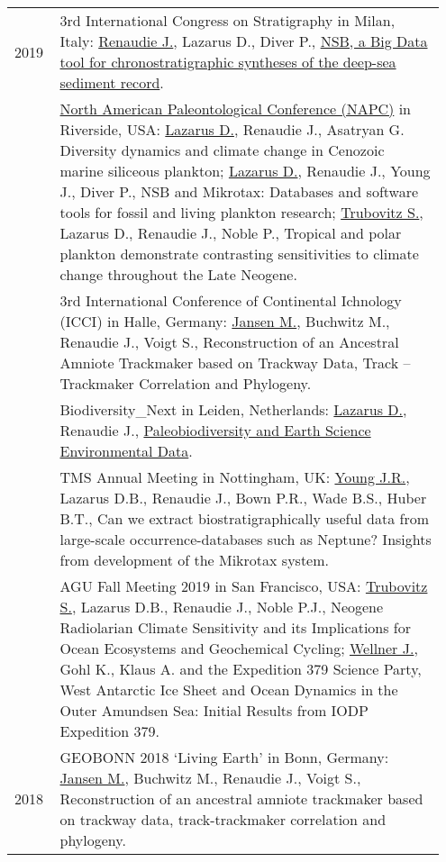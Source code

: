 \documentclass[11pt, a4paper]{article}
\makeatletter
\newcommand\footnoteref[1]{\protected@xdef\@thefnmark{\ref{#1}}\@footnotemark}
\makeatother
\begin{document}
\begin{longtable}{p{0.1\linewidth} P{0.85\linewidth}}
2019 & 3rd International Congress on Stratigraphy in Milan, Italy: \underline{Renaudie J.}, Lazarus D., Diver P., \href{http://plannapus.github.io/data/20190723Potsdam.pdf}{NSB, a Big Data tool for chronostratigraphic syntheses of the deep-sea sediment record}.\\
& \href{https://escholarship.org/uc/item/6r18f8wn}{North American Paleontological Conference (NAPC)} in Riverside, USA: \underline{Lazarus D.}, Renaudie J., Asatryan G. Diversity dynamics and climate change in Cenozoic marine siliceous plankton; \underline{Lazarus D.}, Renaudie J., Young J., Diver P., NSB and Mikrotax: Databases and software tools for fossil and living plankton research; \underline{Trubovitz S.}, Lazarus D., Renaudie J., Noble P., Tropical and polar plankton demonstrate contrasting sensitivities to climate change throughout the Late Neogene.\\
 & 3rd International Conference of Continental Ichnology (ICCI) in Halle, Germany: \underline{Jansen M.}, Buchwitz M., Renaudie J., Voigt S., Reconstruction of an Ancestral Amniote Trackmaker based on Trackway Data, Track -- Trackmaker Correlation and Phylogeny.\\
& Biodiversity\_Next in Leiden, Netherlands: \underline{Lazarus D.}, Renaudie J., \href{http://dx.doi.org/10.3897/biss.3.37066}{Paleobiodiversity and Earth Science Environmental Data}.\\
 & TMS Annual Meeting in Nottingham, UK: \underline{Young J.R.}, Lazarus D.B., Renaudie J., Bown P.R., Wade B.S., Huber B.T., Can we extract biostratigraphically useful data from large-scale occurrence-databases such as Neptune? Insights from development of the Mikrotax system.\\
 & AGU Fall Meeting 2019 in San Francisco, USA: \underline{Trubovitz S.}, Lazarus D.B., Renaudie J., Noble P.J., Neogene Radiolarian Climate Sensitivity and its Implications for Ocean Ecosystems and Geochemical Cycling; \underline{Wellner J.}, Gohl K., Klaus A. and the Expedition 379 Science Party\footnoteref{exp379scientists}, West Antarctic Ice Sheet and Ocean Dynamics in the Outer Amundsen Sea: Initial Results from IODP Expedition 379.\\
2018 & GEOBONN 2018 `Living Earth' in Bonn, Germany: \underline{Jansen M.}, Buchwitz M., Renaudie J., Voigt S., Reconstruction of an ancestral amniote trackmaker based on trackway data, track-trackmaker correlation and phylogeny.\\

\end{longtable}
\end{document}
